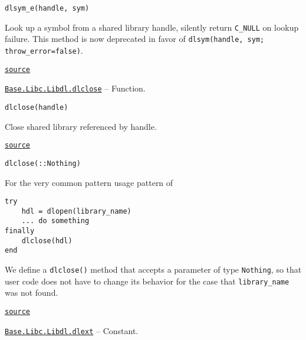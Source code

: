 \begin{adjustwidth}{2em}{0pt}


\begin{verbatim}
dlsym_e(handle, sym)
\end{verbatim}

Look up a symbol from a shared library handle, silently return \texttt{C\_NULL} on lookup failure. This method is now deprecated in favor of \texttt{dlsym(handle, sym; throw\_error=false)}.



\href{https://github.com/JuliaLang/julia/blob/9058264a69f9efc1af805c4473c946f87859b731/base/libdl.jl#L66-L71}{\texttt{source}}


\end{adjustwidth}
\hypertarget{15677733465507167231}{}
\hyperlink{15677733465507167231}{\texttt{Base.Libc.Libdl.dlclose}}  -- {Function.}

\begin{adjustwidth}{2em}{0pt}


\begin{verbatim}
dlclose(handle)
\end{verbatim}

Close shared library referenced by handle.



\href{https://github.com/JuliaLang/julia/blob/9058264a69f9efc1af805c4473c946f87859b731/base/libdl.jl#L156-L160}{\texttt{source}}



\begin{lstlisting}
dlclose(::Nothing)
\end{lstlisting}

For the very common pattern usage pattern of


\begin{lstlisting}
try
    hdl = dlopen(library_name)
    ... do something
finally
    dlclose(hdl)
end
\end{lstlisting}

We define a \texttt{dlclose()} method that accepts a parameter of type \texttt{Nothing}, so that user code does not have to change its behavior for the case that \texttt{library\_name} was not found.



\href{https://github.com/JuliaLang/julia/blob/9058264a69f9efc1af805c4473c946f87859b731/base/libdl.jl#L165-L180}{\texttt{source}}


\end{adjustwidth}
\hypertarget{688143363758820257}{}
\hyperlink{688143363758820257}{\texttt{Base.Libc.Libdl.dlext}}  -- {Constant.}

